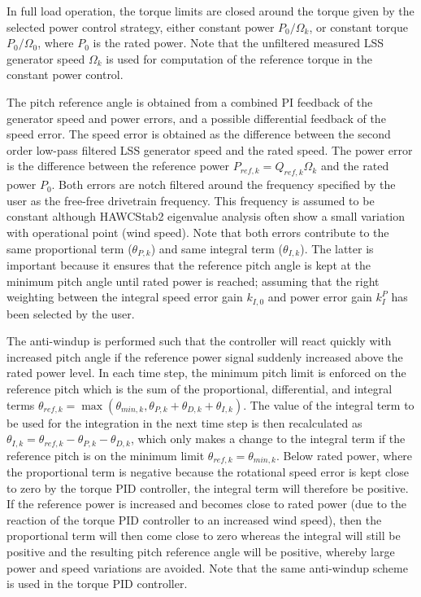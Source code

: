 In full load operation, the torque limits are closed around the torque given by the selected power control strategy, either constant power $P_0/\Omega_k$, or constant torque $P_0/\Omega_0$, where $P_0$ is the rated power. Note that the unfiltered measured LSS generator speed $\Omega_k$ is used for computation of the reference torque in the constant power control.

The pitch reference angle is obtained from a combined PI feedback of the generator speed and power errors, and a possible differential feedback of the speed error. The speed error is obtained as the difference between the second order low-pass filtered LSS generator speed and the rated speed. The power error is the difference between the reference power $P_{ref,k}=Q_{ref,k}\Omega_k$ and the rated power $P_0$. Both errors are notch filtered around the frequency specified by the user as the free-free drivetrain frequency. This frequency is assumed to be constant although HAWCStab2 eigenvalue analysis often show a small variation with operational point (wind speed). Note that both errors contribute to the same proportional term ($\theta_{P,k}$) and same integral term ($\theta_{I,k}$). The latter is important because it ensures that the reference pitch angle is kept at the minimum pitch angle until rated power is reached; assuming that the right weighting between the integral speed error gain $k_{I,0}$ and power error gain $k_I^P$ has been selected by the user.

The anti-windup is performed such that the controller will react quickly with increased pitch angle if the reference power signal suddenly increased above the rated power level. In each time step, the minimum pitch limit is enforced on the reference pitch which is the sum of the proportional, differential, and integral terms $\theta_{ref,k}=\max\left(\theta_{min,k},\theta_{P,k}+\theta_{D,k}+\theta_{I,k}\right)$. The value of the integral term to be used for the integration in the next time step is then recalculated as $\theta_{I,k}=\theta_{ref,k}-\theta_{P,k}-\theta_{D,k}$, which only makes a change to the integral term if the reference pitch is on the minimum limit $\theta_{ref,k}=\theta_{min,k}$. Below rated power, where the proportional term is negative because the rotational speed error is kept close to zero by the torque PID controller, the integral term will therefore be positive. If the reference power is increased and becomes close to rated power (due to the reaction of the torque PID controller to an increased wind speed), then the proportional term will then come close to zero whereas the integral will still be positive and the resulting pitch reference angle will be positive, whereby large power and speed variations are avoided. Note that the same anti-windup scheme is used in the torque PID controller.

